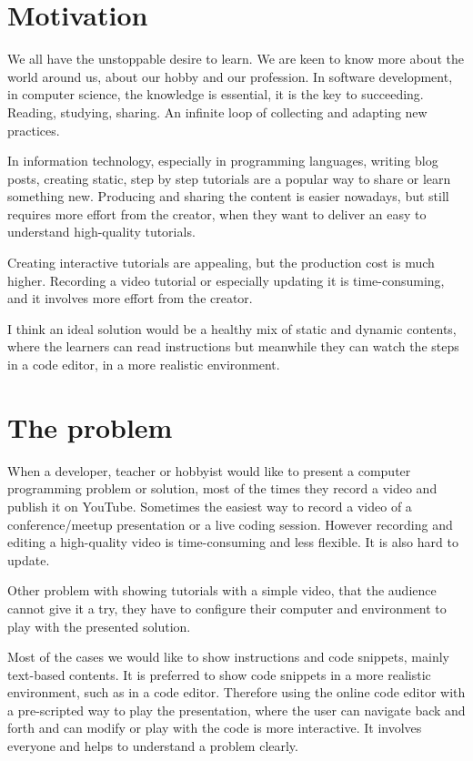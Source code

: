 \documentclass[12pt, a4paper, oneside, openright, medskipamount]{report}
\begin{document}
\section{Motivation}

We all have the unstoppable desire to learn. We are keen to know more about the world around us, about our hobby and our profession. In software development, in computer science, the knowledge is essential, it is the key to succeeding. Reading, studying, sharing. An infinite loop of collecting and adapting new practices.

In information technology, especially in programming languages, writing blog posts, creating static, step by step tutorials are a popular way to share or learn something new. Producing and sharing the content is easier nowadays, but still requires more effort from the creator, when they want to deliver an easy to understand high-quality tutorials.

Creating interactive tutorials are appealing, but the production cost is much higher. Recording a video tutorial or especially updating it is time-consuming, and it involves more effort from the creator.

I think an ideal solution would be a healthy mix of static and dynamic contents, where the learners can read instructions but meanwhile they can watch the steps in a code editor, in a more realistic environment.

\section{The problem}

When a developer, teacher or hobbyist would like to present a computer programming problem or solution, most of the times they record a video and publish it on YouTube. Sometimes the easiest way to record a video of a conference/meetup presentation or a live coding session. However recording and editing a high-quality video is time-consuming and less flexible. It is also hard to update.

Other problem with showing tutorials with a simple video, that the audience cannot give it a try, they have to configure their computer and environment to play with the presented solution.

Most of the cases we would like to show instructions and code snippets, mainly text-based contents. It is preferred to show code snippets in a more realistic environment, such as in a code editor. Therefore using the online code editor with a pre-scripted way to play the presentation, where the user can navigate back and forth and can modify or play with the code is more interactive. It involves everyone and helps to understand a problem clearly.
\end{document}
